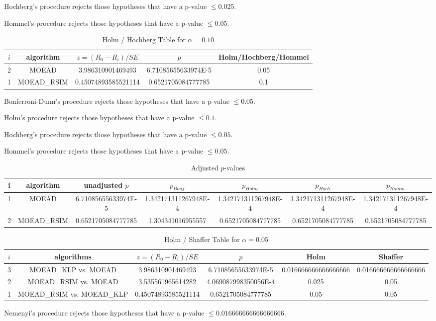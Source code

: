 \documentclass[a4paper,10pt]{article}
\begin{document}
\begin{landscape}
Hochberg's procedure rejects those hypotheses that have a p-value $\le0.025$.


Hommel's procedure rejects those hypotheses that have a p-value $\le0.05$.


\begin{table}[!htp]
\centering\tiny
\caption{Holm / Hochberg Table for $\alpha=0.10$}
\begin{tabular}{ccccc}
$i$&algorithm&$z=(R_0 - R_i)/SE$&$p$&Holm/Hochberg/Hommel\\
\hline
2&MOEAD&3.986310901469493&6.71085655633974E-5&0.05\\
1&MOEAD_RSIM&0.45074893585521114&0.6521705084777785&0.1\\
\hline
\end{tabular}
\end{table}
Bonferroni-Dunn's procedure rejects those hypotheses that have a p-value $\le0.05$.


Holm's procedure rejects those hypotheses that have a p-value $\le0.1$.


Hochberg's procedure rejects those hypotheses that have a p-value $\le0.05$.


Hommel's procedure rejects those hypotheses that have a p-value $\le0.05$.


\begin{table}[!htp]
\centering\tiny
\caption{Adjusted $p$-values}
\begin{tabular}{ccccccc}
i&algorithm&unadjusted $p$&$p_{Bonf}$&$p_{Holm}$&$p_{Hoch}$&$p_{Homm}$\\
\hline
1&MOEAD&6.71085655633974E-5&1.342171311267948E-4&1.342171311267948E-4&1.342171311267948E-4&1.342171311267948E-4\\
2&MOEAD_RSIM&0.6521705084777785&1.304341016955557&0.6521705084777785&0.6521705084777785&0.6521705084777785\\
\hline
\end{tabular}
\end{table}

\begin{table}[!htp]
\centering\tiny
\caption{Holm / Shaffer Table for $\alpha=0.05$}
\begin{tabular}{cccccc}
$i$&algorithms&$z=(R_0 - R_i)/SE$&$p$&Holm&Shaffer\\
\hline
3&MOEAD_KLP vs. MOEAD&3.986310901469493&6.71085655633974E-5&0.016666666666666666&0.016666666666666666\\
2&MOEAD_RSIM vs. MOEAD&3.535561965614282&4.069087998350056E-4&0.025&0.05\\
1&MOEAD_RSIM vs. MOEAD_KLP&0.45074893585521114&0.6521705084777785&0.05&0.05\\
\hline
\end{tabular}
\end{table}
Nemenyi's procedure rejects those hypotheses that have a p-value $\le0.016666666666666666$.



\end{landscape}
\end{document}
